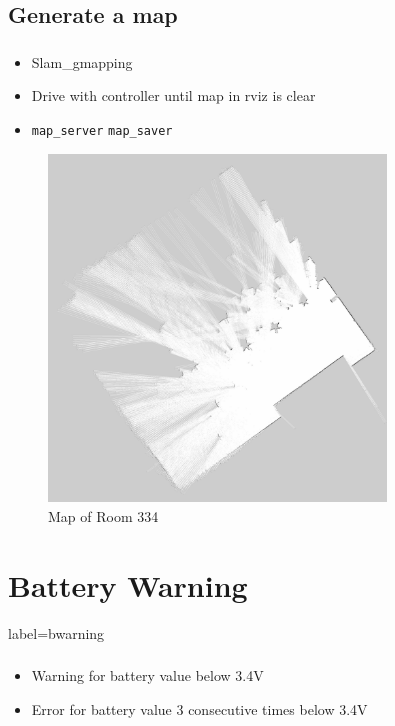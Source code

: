 \documentclass[numberofslides]{AMSBeamer}
\begin{document}
\subsection{Generate a map}
\begin{frame}[label=map]
	\frametitle{\insertsectionhead}%
    \begin{minipage}{0.5\textwidth}
        \textbf{\insertsubsectionhead}
        \begin{itemize}
            \item Slam\_gmapping
            \item Drive with controller until map in rviz is clear
            \item \texttt{map\_server} \texttt{map\_saver}
        \end{itemize}
    \end{minipage}%
    \begin{minipage}{0.5\textwidth}
        \begin{figure}
            \centering
                \includegraphics[width=0.8\textwidth]{Presentations/LaTeX/images/map334.jpg}
                \caption{Map of Room 334}
            \label{fig:map334}
        \end{figure}
        
    \end{minipage}  
\end{frame}

\section{Battery Warning}
\begin{frame}{label=bwarning}
    \frametitle{\insertsectionhead}
    \begin{itemize}
        \item Warning for battery value below 3.4V
        \item Error for battery value 3 consecutive times below 3.4V
    \end{itemize}
\end{frame}
\end{document}
